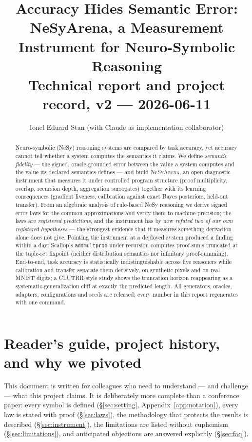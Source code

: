 \documentclass[10pt]{article}
\title{Accuracy Hides Semantic Error:\\
NeSyArena, a Measurement Instrument for Neuro-Symbolic Reasoning\\
\large Technical report and project record, v2 --- 2026-06-11}
\author{Ionel Eduard Stan \quad (with Claude as implementation collaborator)}
\date{}
\theoremstyle{remark}
\begin{document}
\maketitle

\begin{abstract}
\noindent
Neuro-symbolic (NeSy) reasoning systems are compared by task accuracy, yet accuracy cannot tell
whether a system computes the semantics it claims. We define \emph{semantic fidelity} --- the
signed, oracle-grounded error between the value a system computes and the value its declared
semantics defines --- and build \textsc{NeSyArena}, an open diagnostic instrument that measures it
under controlled program structure (proof multiplicity, overlap, recursion depth, aggregation
surrogates) together with its learning consequences (gradient liveness, calibration against exact
Bayes posteriors, held-out transfer). From an algebraic analysis of rule-based NeSy reasoning we
derive signed error laws for the common approximations and verify them to machine precision; the
laws are \emph{registered predictions}, and the instrument has by now \emph{refuted two of our own
registered hypotheses} --- the strongest evidence that it measures something derivation alone does
not give. Pointing the instrument at a deployed system produced a finding within a day: Scallop's
\texttt{addmultprob} under recursion computes proof-sums truncated at the tuple-set fixpoint
(neither distribution semantics nor infinitary proof-summing). End-to-end, task
accuracy is statistically indistinguishable across five reasoners while calibration and transfer
separate them decisively, on synthetic pixels and on real MNIST digits; a CLUTRR-style study shows
the truncation horizon reappearing as a systematic-generalization cliff at exactly the predicted
length. All generators, oracles, adapters, configurations and seeds are released; every number in
this report regenerates with one command.
\end{abstract}

\tableofcontents

\section{Reader's guide, project history, and why we pivoted}\label{sec:history}

This document is written for colleagues who need to understand --- and challenge --- what this
project claims. It is deliberately more complete than a conference paper: every symbol is defined
(\S\ref{sec:setting}, Appendix~\ref{app:notation}), every law is stated with proof
(\S\ref{sec:laws}), the methodology that protects the results is described
(\S\ref{sec:instrument}), the limitations are listed without euphemism (\S\ref{sec:limitations}),
and anticipated objections are answered explicitly (\S\ref{sec:faq}).
\end{document}

